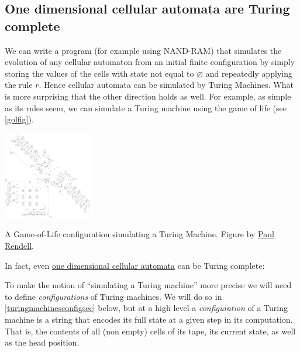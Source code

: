 \subsection{One dimensional cellular automata are Turing
complete}\label{One-dimensional-cellular-}

We can write a program (for example using NAND-RAM) that simulates the
evolution of any cellular automaton from an initial finite configuration
by simply storing the values of the cells with state not equal to
\(\varnothing\) and repeatedly applying the rule \(r\). Hence cellular
automata can be simulated by Turing Machines. What is more surprising
that the other direction holds as well. For example, as simple as its
rules seem, we can simulate a Turing machine using the game of life (see
\cref{golfig}).


\begin{marginfigure}
\centering
\includegraphics[width=\linewidth, height=1.5in, keepaspectratio]{../figure/turing_gol.jpg}
\caption{A Game-of-Life configuration simulating a Turing Machine.
Figure by \href{http://rendell-attic.org/gol/tm.htm}{Paul Rendell}.}
\label{golfig}
\end{marginfigure}

In fact, even \href{https://en.wikipedia.org/wiki/Rule_110}{one
dimensional cellular automata} can be Turing complete:

\hypertarget{onedimcathm}{}

To make the notion of ``simulating a Turing machine'' more precise we
will need to define \emph{configurations} of Turing machines. We will do
so in \cref{turingmachinesconfigsec} below, but at a high level a
\emph{configuration} of a Turing machine is a string that encodes its
full state at a given step in its computation. That is, the contents of
all (non empty) cells of its tape, its current state, as well as the
head position.

